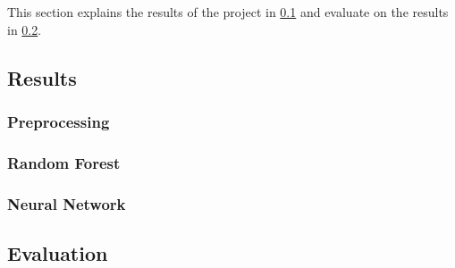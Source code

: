 This section explains the results of the project in \ref{subsec:results} and evaluate on the results in \ref{subsec:evaluation}.

\subsection{Results}
\label{subsec:results}

\subsubsection{Preprocessing}








\subsubsection{Random Forest}

\subsubsection{Neural Network}



\subsection{Evaluation}
\label{subsec:evaluation}